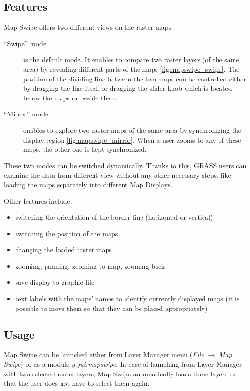 \documentclass[a4paper,12pt,oneside]{book}
\newcommand{\module}[1]{\textsl{#1}}
\newcommand{\ms}{Map Swipe\xspace}
\begin{document}
\subsection{Features}
Map Swipe offers two different views on the raster maps.
\begin{description}
  \item[``Swipe'' mode] is the default mode. It enables to compare two raster layers (of the same area)
  by revealing different parts of the maps \ref{fig:mapswipe_swipe}.
  The position of the dividing line between the two maps
  can be controlled either by dragging the line itself or dragging the slider knob which
  is located below the maps or beside them.

  \item[``Mirror'' mode] enables to explore two raster maps of the same area by
  synchronizing the display region \ref{fig:mapswipe_mirror}. When a user zooms
  to any of these maps, the other one is kept synchronized.
\end{description}

These two modes can be switched dynamically. Thanks to this, GRASS users can
examine the data from different view without any other necessary steps, like loading
the maps separately into different Map Displays.

Other features include:
\begin{itemize}
    \item switching the orientation of the border line (horizontal or vertical)
    \item switching the position of the maps
    \item changing the loaded raster maps
    \item zooming, panning, zooming to map, zooming back
    \item save display to graphic file
    \item text labels with the maps' names to identify currently displayed maps
    (it is possible to move them so that they can be placed appropriately)
\end{itemize}

    
\subsection{Usage}
\ms can be launched either from Layer Manager menu (\emph{File} $\rightarrow$ \emph{Map Swipe}) or
as a module \module{g.gui.mapswipe}.
In case of launching from Layer Manager with two selected raster layers,
\ms automatically loads these layers so that the user does not have to select them again.
\end{document}
